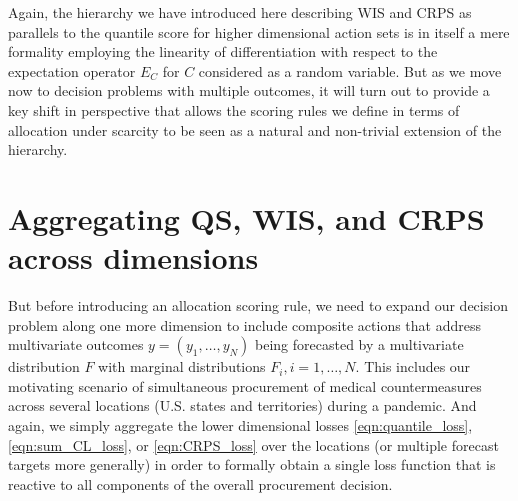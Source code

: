 \documentclass{article}
\begin{document}
Again, the hierarchy we have introduced here describing WIS and CRPS as parallels to the quantile score for higher dimensional action sets is in itself a mere formality employing the linearity of differentiation with respect to the expectation operator $E_{C}$ for $C$ considered as a random variable. But as we move now to decision problems with multiple outcomes, it will turn out to provide a key shift in perspective that allows the scoring rules we define in terms of allocation under scarcity to be seen as a natural and non-trivial extension of the hierarchy. 


\section{Aggregating QS, WIS, and CRPS across dimensions}

But before introducing an allocation scoring rule, we need to expand our decision problem along one more dimension to include composite actions that address multivariate outcomes $y = (y_1,\ldots,y_N)$ being forecasted by a multivariate distribution $F$
with marginal distributions $F_i, i = 1,\ldots,N$. 
This includes our motivating scenario of simultaneous procurement of medical countermeasures across several locations (U.S. states and territories) during a pandemic. And again, we simply aggregate the lower dimensional losses \eqref{eqn:quantile_loss}, \eqref{eqn:sum_CL_loss}, or \eqref{eqn:CRPS_loss} over the locations (or multiple forecast targets more generally) in order to formally obtain a single loss function that is reactive to all components of the overall procurement decision. 
\end{document}
